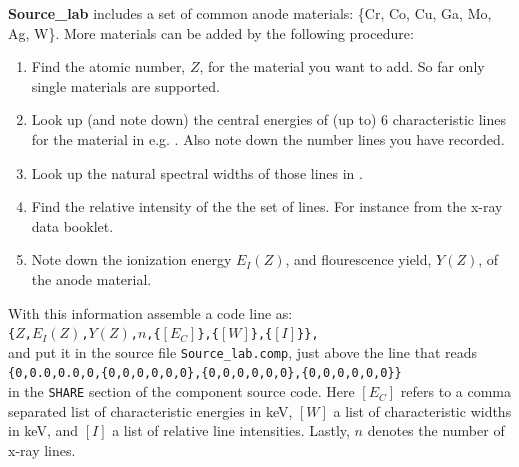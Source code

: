 \textbf{Source\_lab} includes a set of common anode materials: \{Cr, Co, Cu, Ga, Mo, Ag, W\}. More materials can be added by the following procedure:
\begin{enumerate}
\item Find the atomic number, $Z$, for the material you want to add. So far only single materials are supported.
\item Look up (and note down) the central energies of (up to) 6 characteristic lines for the material in e.g. \cite{bearden1967x}. Also note down the number lines you have recorded.
\item Look up the natural spectral widths of those lines in \cite{krause1979natural}.
\item Find the relative intensity of the the set of lines. For instance from the x-ray data booklet.
\item Note down the ionization energy $E_I(Z)$, and flourescence yield, $Y(Z)$, of the anode material.
\end{enumerate}
With this information assemble a code line as:\\
\texttt{\{$Z$,$E_I(Z)$,$Y(Z)$,$n$,\{$[E_C]$\},\{$[W]$\},\{$[I]$\}\},}\\
 and put it in the source file \texttt{Source\_lab.comp}, just above the line that reads\\
\texttt{\{0,0.0,0.0,0,\{0,0,0,0,0,0\},\{0,0,0,0,0,0\},\{0,0,0,0,0,0\}\}}\\
in the \texttt{SHARE} section of the component source code.
Here $[E_C]$ refers to a comma separated list of characteristic energies in \si{keV}, $[W]$ a
list of characteristic widths in \si{keV}, and $[I]$ a list of relative line intensities.
Lastly, $n$ denotes the number of x-ray lines.
